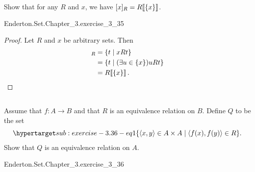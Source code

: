 \documentclass{report}
\begin{document}
\subsection{}%

  Show that for any $R$ and $x$, we have $[x]_R = R\!\left\llbracket\{x\}\right\rrbracket$.

    {Enderton.Set.Chapter\_3.exercise\_3\_35}

  \begin{proof}
    Let $R$ and $x$ be arbitrary sets.
    Then
      \begin{align*}
        [x]_R
          & = \{t \mid xRt\} \\
          & = \{t \mid (\exists u \in \{x\})uRt\} \\
          & = \img{R}{\{x\}}.
      \end{align*}
  \end{proof}

\subsection{}%

  Assume that $f \colon A \rightarrow B$ and that $R$ is an equivalence relation
    on $B$.
  Define $Q$ to be the set
    \begin{equation}
      \hyperlabel{sub:exercise-3.36-eq1}
      \{\tuple{x, y} \in A \times A \mid \tuple{f(x), f(y)} \in R\}.
    \end{equation}
  Show that $Q$ is an equivalence relation on $A$.

    {Enderton.Set.Chapter\_3.exercise\_3\_36}
\end{document}
